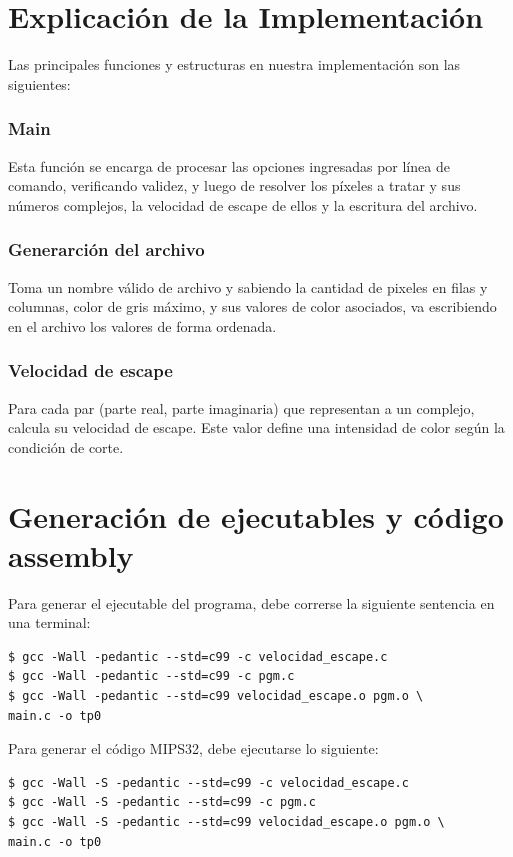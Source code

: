 \documentclass[a4paper,10pt]{article}
\begin{document}
\section{Explicaci\'on de la Implementaci\'on}
Las principales funciones y estructuras en nuestra implementaci\'on son las siguientes:

\subsubsection{Main}
Esta funci\'on se encarga de procesar las opciones ingresadas por l\'inea de comando, verificando validez, y luego de resolver los p\'ixeles a tratar y sus números complejos, la velocidad de escape de ellos y la escritura del archivo.

\subsubsection{Generarción del archivo}
Toma un nombre válido de archivo y sabiendo la cantidad de pixeles en filas y columnas, color de gris m\'aximo, y sus valores de color asociados, va escribiendo en el archivo los valores de forma ordenada.

\subsubsection{Velocidad de escape}
Para cada par (parte real, parte imaginaria) que representan a un complejo, calcula su velocidad de escape. Este valor define una intensidad de color seg\'un la condici\'on de corte.


\section{Generaci\'on de ejecutables y c\'odigo assembly}
Para generar el ejecutable del programa, debe correrse la siguiente sentencia en una terminal:

\begin{verbatim}
$ gcc -Wall -pedantic --std=c99 -c velocidad_escape.c
$ gcc -Wall -pedantic --std=c99 -c pgm.c
$ gcc -Wall -pedantic --std=c99 velocidad_escape.o pgm.o \
main.c -o tp0
\end{verbatim}

Para generar el c\'odigo MIPS32, debe ejecutarse lo siguiente:
\begin{verbatim}
$ gcc -Wall -S -pedantic --std=c99 -c velocidad_escape.c
$ gcc -Wall -S -pedantic --std=c99 -c pgm.c
$ gcc -Wall -S -pedantic --std=c99 velocidad_escape.o pgm.o \
main.c -o tp0
\end{verbatim}
\end{document}
